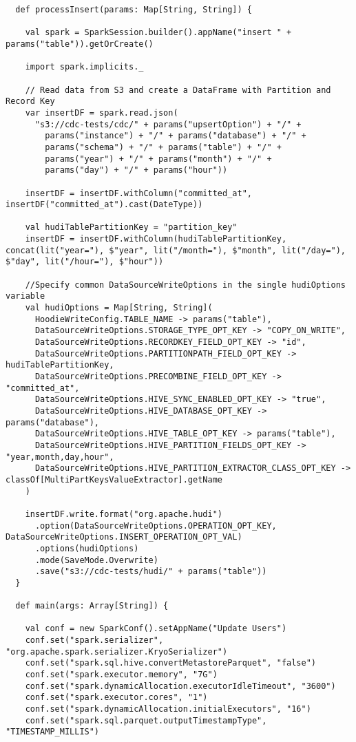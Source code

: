 \documentclass[12pt, oneside, a4paper, brazil]{abntex2}
\begin{document}
\begin{apendicesenv}
\begin{lstlisting}
  def processInsert(params: Map[String, String]) {

    val spark = SparkSession.builder().appName("insert " + params("table")).getOrCreate()

    import spark.implicits._

    // Read data from S3 and create a DataFrame with Partition and Record Key
    var insertDF = spark.read.json(
      "s3://cdc-tests/cdc/" + params("upsertOption") + "/" +
        params("instance") + "/" + params("database") + "/" +
        params("schema") + "/" + params("table") + "/" +
        params("year") + "/" + params("month") + "/" +
        params("day") + "/" + params("hour"))

    insertDF = insertDF.withColumn("committed_at", insertDF("committed_at").cast(DateType))

    val hudiTablePartitionKey = "partition_key"
    insertDF = insertDF.withColumn(hudiTablePartitionKey, concat(lit("year="), $"year", lit("/month="), $"month", lit("/day="), $"day", lit("/hour="), $"hour"))

    //Specify common DataSourceWriteOptions in the single hudiOptions variable
    val hudiOptions = Map[String, String](
      HoodieWriteConfig.TABLE_NAME -> params("table"),
      DataSourceWriteOptions.STORAGE_TYPE_OPT_KEY -> "COPY_ON_WRITE",
      DataSourceWriteOptions.RECORDKEY_FIELD_OPT_KEY -> "id",
      DataSourceWriteOptions.PARTITIONPATH_FIELD_OPT_KEY -> hudiTablePartitionKey,
      DataSourceWriteOptions.PRECOMBINE_FIELD_OPT_KEY -> "committed_at",
      DataSourceWriteOptions.HIVE_SYNC_ENABLED_OPT_KEY -> "true",
      DataSourceWriteOptions.HIVE_DATABASE_OPT_KEY -> params("database"),
      DataSourceWriteOptions.HIVE_TABLE_OPT_KEY -> params("table"),
      DataSourceWriteOptions.HIVE_PARTITION_FIELDS_OPT_KEY -> "year,month,day,hour",
      DataSourceWriteOptions.HIVE_PARTITION_EXTRACTOR_CLASS_OPT_KEY -> classOf[MultiPartKeysValueExtractor].getName
    )

    insertDF.write.format("org.apache.hudi")
      .option(DataSourceWriteOptions.OPERATION_OPT_KEY, DataSourceWriteOptions.INSERT_OPERATION_OPT_VAL)
      .options(hudiOptions)
      .mode(SaveMode.Overwrite)
      .save("s3://cdc-tests/hudi/" + params("table"))
  }

  def main(args: Array[String]) {

    val conf = new SparkConf().setAppName("Update Users")
    conf.set("spark.serializer", "org.apache.spark.serializer.KryoSerializer")
    conf.set("spark.sql.hive.convertMetastoreParquet", "false")
    conf.set("spark.executor.memory", "7G")
    conf.set("spark.dynamicAllocation.executorIdleTimeout", "3600")
    conf.set("spark.executor.cores", "1")
    conf.set("spark.dynamicAllocation.initialExecutors", "16")
    conf.set("spark.sql.parquet.outputTimestampType", "TIMESTAMP_MILLIS")


\end{lstlisting}
\end{apendicesenv}
\end{document}
